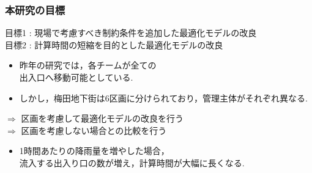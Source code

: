 \documentclass[12pt,dvipdfmx]{beamer}
\begin{document}
\frame
    {
      \frametitle{本研究の目標}
      目標1 : 現場で考慮すべき制約条件を追加した最適化モデルの改良\\目標2 : 計算時間の短縮を目的とした最適化モデルの改良

      \begin{minipage}{0.6\columnwidth}
        \centering
      \begin{beamerboxesrounded}
        {}
        \footnotesize
      \begin{itemize}
      \item 昨年の研究では，各チームが全ての\\出入口へ移動可能としている.
      \item しかし，梅田地下街は6区画に分けられており，管理主体がそれぞれ異なる.
      \end{itemize}
      
      $\Rightarrow$ 区画を考慮して最適化モデルの改良を行う\\
      $\Rightarrow$ 区画を考慮しない場合との比較を行う
      \end{beamerboxesrounded}
             
      \begin{beamerboxesrounded}
        {}
        \footnotesize
      \begin{itemize}
      \item 1時間あたりの降雨量を増やした場合，\\流入する出入り口の数が増え，計算時間が大幅に長くなる.
      \end{itemize}
      

\end{beamerboxesrounded}
\end{minipage}}
\end{document}
